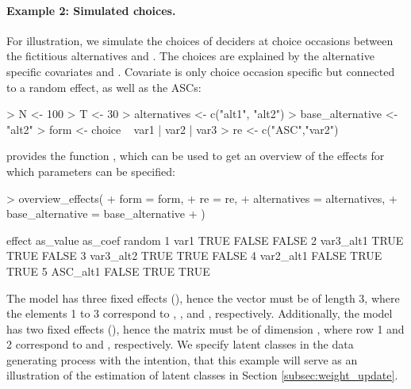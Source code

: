 \documentclass[article]{jss}
\newcommand{\fct}[1]{\code{#1()}}
\begin{document}
\paragraph{Example 2: Simulated choices.} For illustration, we simulate the choices of  deciders at  choice occasions between the fictitious alternatives  and . The choices are explained by the alternative specific covariates  and . Covariate  is only choice occasion specific but connected to a random effect, as well as the ASCs:

\begin{Schunk}
\begin{Sinput}
> N <- 100
> T <- 30
> alternatives <- c("alt1", "alt2")
> base_alternative <- "alt2"
> form <- choice ~ var1 | var2 | var3
> re <- c("ASC","var2")
\end{Sinput}
\end{Schunk}

 provides the function \fct{overview\_effects}, which can be used to get an overview of the effects for which parameters can be specified:

\begin{Schunk}
\begin{Sinput}
> overview_effects(
+    form = form,
+    re = re,
+    alternatives = alternatives,
+    base_alternative = base_alternative
+  )
\end{Sinput}
\begin{Soutput}
     effect as_value as_coef random
1      var1     TRUE   FALSE  FALSE
2 var3_alt1     TRUE    TRUE  FALSE
3 var3_alt2     TRUE    TRUE  FALSE
4 var2_alt1    FALSE    TRUE   TRUE
5  ASC_alt1    FALSE    TRUE   TRUE
\end{Soutput}
\end{Schunk}

The model has three fixed effects (), hence the vector  must be of length 3, where the elements 1 to 3 correspond to , , and , respectively. Additionally, the model has two fixed effects (), hence the matrix  must be of dimension , where row 1 and 2 correspond to  and , respectively. We specify  latent classes in the data generating process with the intention, that this example will serve as an illustration of the estimation of latent classes in Section \ref{subsec:weight_update}.
\end{document}
